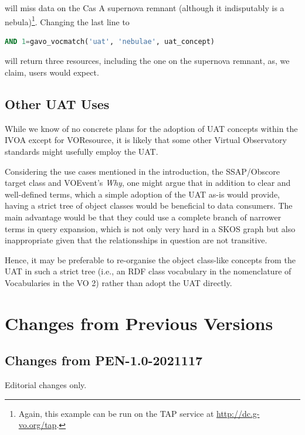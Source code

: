 \documentclass[11pt,a4paper]{ivoa}
\begin{document}
\noindent will miss data on the Cas A supernova remnant (although it indisputably
is a nebula)\footnote{Again, this example can be run on the TAP service
at \url{http://dc.g-vo.org/tap}.}.  Changing the last line to

\begin{lstlisting}[language=SQL]
    AND 1=gavo_vocmatch('uat', 'nebulae', uat_concept)
\end{lstlisting}

\noindent will return three resources, including 
the one on the supernova remnant,
as, we claim, users would expect.

\subsection{Other UAT Uses}

While we know of no concrete plans for the adoption of UAT concepts
within the IVOA except for
VOResource, it is likely that some other Virtual Observatory
standards might usefully employ the UAT.  

Considering the use cases mentioned in the introduction, the
SSAP/Obscore target class and VOEvent's \emph{Why}, one might argue that
in addition to clear and well-defined terms, which a simple adoption
of the UAT as-is would provide, having a strict tree of object
classes would be beneficial to data consumers.  The main advantage would
be that they could use a complete branch of narrower terms in query
expansion, which is not only very hard in a SKOS graph but also
inappropriate given that the relationsships in question are not
transitive.

Hence, it may be preferable to re-organise the object class-like
concepts from the UAT in such a strict tree (i.e., an RDF class
vocabulary in the nomenclature of Vocabularies in the VO 2) rather than
adopt the UAT directly.

\appendix
\section{Changes from Previous Versions}

\subsection{Changes from PEN-1.0-2021117}

Editorial changes only.


\end{document}
